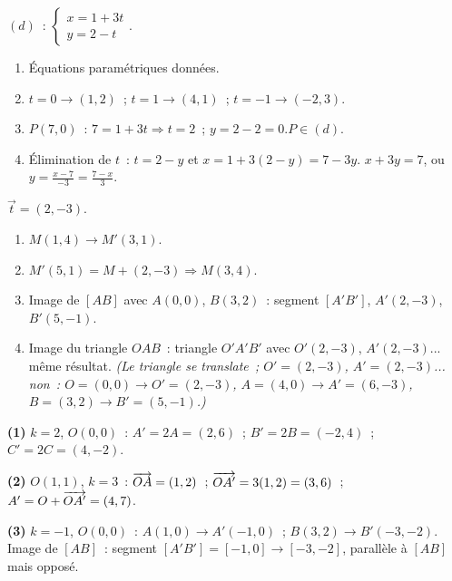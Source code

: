 
$(d)$~: $\begin{cases}x=1+3t\\y=2-t\end{cases}$.
\begin{enumerate}
  \item \'Equations param\'etriques donn\'ees.\checkmark
  \item $t=0\to(1,2)$~; $t=1\to(4,1)$~; $t=-1\to(-2,3)$.
  \item $P(7,0)$~: $7=1+3t\Rightarrow t=2$~; $y=2-2=0$.\checkmark\quad $P\in(d)$.
  \item \'Elimination de $t$~: $t=2-y$ et $x=1+3(2-y)=7-3y$.
        $x+3y=7$, ou $y=\frac{x-7}{-3}=\frac{7-x}{3}$.
\end{enumerate}


$\vec{t}=(2,-3)$.
\begin{enumerate}
  \item $M(1,4)\to M'(3,1)$.
  \item $M'(5,1)=M+(2,-3)\Rightarrow M(3,4)$.
  \item Image de $[AB]$ avec $A(0,0)$, $B(3,2)$~: segment $[A'B']$, $A'(2,-3)$, $B'(5,-1)$.
  \item Image du triangle $OAB$~: triangle $O'A'B'$ avec $O'(2,-3)$, $A'(2,-3)$... m\^eme r\'esultat.
        \emph{(Le triangle se translate~; $O'=(2,-3)$, $A'=(2,-3)$... non~: $O=(0,0)\to O'=(2,-3)$,
        $A=(4,0)\to A'=(6,-3)$, $B=(3,2)\to B'=(5,-1)$.)}
\end{enumerate}


\textbf{(1)} $k=2$, $O(0,0)$~: $A'=2A=(2,6)$~; $B'=2B=(-2,4)$~; $C'=2C=(4,-2)$.

\textbf{(2)} $O(1,1)$, $k=3$~: $\overrightarrow{OA}=(1,2)$~; $\overrightarrow{OA'}=3(1,2)=(3,6)$~;
$A'=O+\overrightarrow{OA'}=(4,7)$.

\textbf{(3)} $k=-1$, $O(0,0)$~: $A(1,0)\to A'(-1,0)$~; $B(3,2)\to B'(-3,-2)$.
Image de $[AB]$~: segment $[A'B']=[-1,0]\to[-3,-2]$, parall\`ele \`a $[AB]$ mais oppos\'e.


